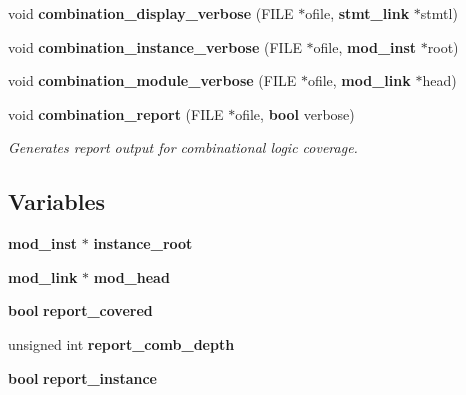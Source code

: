 \begin{CompactItemize}
void {\bf combination\_\-display\_\-verbose} (FILE $\ast$ofile, {\bf stmt\_\-link} $\ast$stmtl)
\item 
void {\bf combination\_\-instance\_\-verbose} (FILE $\ast$ofile, {\bf mod\_\-inst} $\ast$root)
\item 
void {\bf combination\_\-module\_\-verbose} (FILE $\ast$ofile, {\bf mod\_\-link} $\ast$head)
\item 
void {\bf combination\_\-report} (FILE $\ast$ofile, {\bf bool} verbose)
\begin{CompactList}\small\item\em Generates report output for combinational logic coverage.\item\end{CompactList}\end{CompactItemize}
\subsection*{Variables}
\begin{CompactItemize}
\item 
{\bf mod\_\-inst} $\ast$ {\bf instance\_\-root}
\item 
{\bf mod\_\-link} $\ast$ {\bf mod\_\-head}
\item 
{\bf bool} {\bf report\_\-covered}
\item 
unsigned int {\bf report\_\-comb\_\-depth}
\item 
{\bf bool} {\bf report\_\-instance}
\end{CompactItemize}


